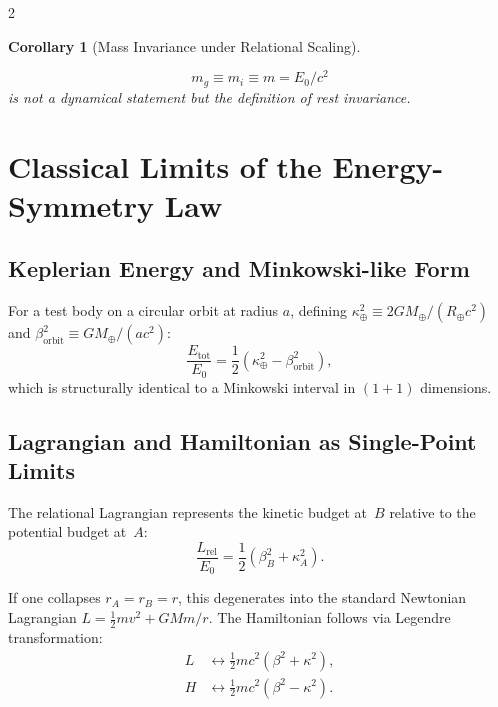 \documentclass[10pt, a4paper]{article}
\newtheorem{corollary}[theorem]{Corollary}
\begin{document}
\begin{multicols}{2}
\begin{corollary}[Mass Invariance under Relational Scaling]
\hypertarget{cor:massinvariance}{}\label{cor:massinvariance}
\[
\boxed{m_g \equiv m_i \equiv m = E_0/c^2}
\]
is not a dynamical statement but the definition of rest invariance.
\end{corollary}



\section{Classical Limits of the Energy-Symmetry Law}
\hypertarget{sec:classical_vs_WILL}{}\label{sec:classical_vs_WILL}

\subsection{Keplerian Energy and Minkowski-like Form}

For a test body on a circular orbit at radius $a$, defining $\kappa_\oplus^2 \equiv 2GM_\oplus/(R_\oplus c^2)$ and $\beta_{\text{orbit}}^2 \equiv GM_\oplus/(ac^2)$:
\hypertarget{eq:will_minkowski_energy}{}\label{eq:will_minkowski_energy}
\begin{equation}
\frac{E_{\text{tot}}}{E_0} = \frac{1}{2}(\kappa_\oplus^2 - \beta_{\text{orbit}}^2),
\end{equation}
which is structurally identical to a Minkowski interval in $(1+1)$ dimensions.

\subsection{Lagrangian and Hamiltonian as Single-Point Limits}
\hypertarget{sec:LH}{}\label{sec:LH}

The relational Lagrangian represents the kinetic budget at~$B$ relative to the potential budget at~$A$:
\[
\frac{L_{\text{rel}}}{E_0} = \frac{1}{2}(\beta_B^2 + \kappa_A^2).
\]

If one collapses $r_A = r_B = r$, this degenerates into the standard Newtonian Lagrangian $L = \frac{1}{2}mv^2 + GMm/r$. The Hamiltonian follows via Legendre transformation:
\begin{align}
L &\longleftrightarrow \tfrac{1}{2}mc^2(\beta^2 + \kappa^2), \\
H &\longleftrightarrow \tfrac{1}{2}mc^2(\beta^2 - \kappa^2).
\end{align}


\end{multicols}
\end{document}

